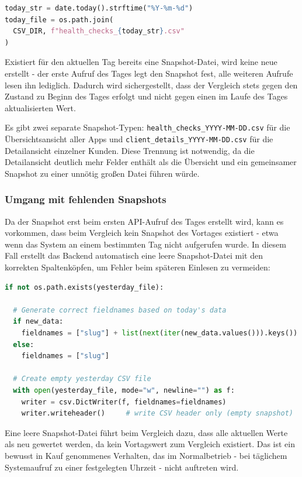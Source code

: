 \begin{lstlisting}[language=Python, caption={Dateinamen der Snapshot-Dateien}, label={lst:snapshot-filenames}]
today_str = date.today().strftime("%Y-%m-%d")
today_file = os.path.join(
  CSV_DIR, f"health_checks_{today_str}.csv"
)
\end{lstlisting}

Existiert für den aktuellen Tag bereits eine Snapshot-Datei, wird keine neue erstellt - der erste Aufruf des Tages legt den Snapshot fest, alle weiteren Aufrufe lesen ihn lediglich. Dadurch wird sichergestellt, dass der Vergleich stets gegen den Zustand zu Beginn des Tages erfolgt und nicht gegen einen im Laufe des Tages aktualisierten Wert.

Es gibt zwei separate Snapshot-Typen: \texttt{health\_checks\_YYYY-MM-DD.csv} für die Übersichtsansicht aller Apps und \texttt{client\_details\_YYYY-MM-DD.csv} für die Detailansicht einzelner Kunden. Diese Trennung ist notwendig, da die Detailansicht deutlich mehr Felder enthält als die Übersicht und ein gemeinsamer Snapshot zu einer unnötig großen Datei führen würde.

\subsubsection{Umgang mit fehlenden Snapshots}
Da der Snapshot erst beim ersten API-Aufruf des Tages erstellt wird, kann es vorkommen, dass beim Vergleich kein Snapshot des Vortages existiert - etwa wenn das System an einem bestimmten Tag nicht aufgerufen wurde. In diesem Fall erstellt das Backend automatisch eine leere Snapshot-Datei mit den korrekten Spaltenköpfen, um Fehler beim späteren Einlesen zu vermeiden:

\begin{lstlisting}[language=Python, caption={Automatische Erstellung eines leeren Snapshots}, label={lst:empty-snapshot}]
if not os.path.exists(yesterday_file):

  # Generate correct fieldnames based on today's data
  if new_data:
    fieldnames = ["slug"] + list(next(iter(new_data.values())).keys())
  else:
    fieldnames = ["slug"]

  # Create empty yesterday CSV file
  with open(yesterday_file, mode="w", newline="") as f:
    writer = csv.DictWriter(f, fieldnames=fieldnames)
    writer.writeheader()     # write CSV header only (empty snapshot)
\end{lstlisting}

Eine leere Snapshot-Datei führt beim Vergleich dazu, dass alle aktuellen Werte als neu gewertet werden, da kein Vortagswert zum Vergleich existiert. Das ist ein bewusst in Kauf genommenes Verhalten, das im Normalbetrieb - bei täglichem Systemaufruf zu einer festgelegten Uhrzeit - nicht auftreten wird.

